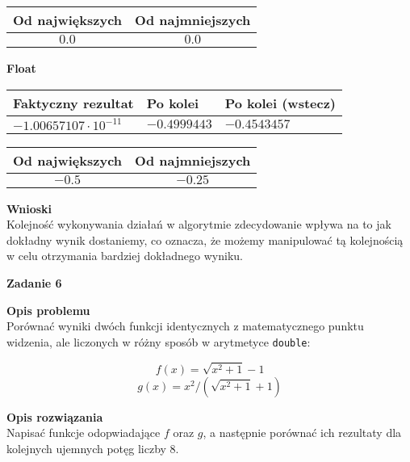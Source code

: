 \documentclass{article}
\begin{document}
\begin{center}
	\begin{tabular}{|c|c|}
		\hline
		\textbf{Od największych} & \textbf{Od najmniejszych} \\
		\hline
		$0.0$                    & $0.0$                     \\
		\hline
	\end{tabular}
\end{center}

\noindent \textbf{Float}

\begin{center}
	\begin{tabular}{|l|l|l|}
		\hline
		\textbf{Faktyczny rezultat} & \textbf{Po kolei} & \textbf{Po kolei (wstecz)} \\
		\hline
		$-1.00657107\cdot10^{-11}$  & $-0.4999443$      & $-0.4543457$               \\
		\hline
	\end{tabular}
\end{center}

\begin{center}
	\begin{tabular}{|c|c|}
		\hline
		\textbf{Od największych} & \textbf{Od najmniejszych} \\
		\hline
		$-0.5$                   & $-0.25$                   \\
		\hline
	\end{tabular}
\end{center}

\pagebreak

\noindent \textbf{Wnioski} \\
Kolejność wykonywania działań w algorytmie zdecydowanie wpływa na to jak dokładny wynik dostaniemy,
co oznacza, że możemy manipulować tą kolejnością w celu otrzymania bardziej dokładnego wyniku.

\noindent \textbf{\large Zadanie 6}

\noindent \textbf{Opis problemu} \\
Porównać wyniki dwóch funkcji identycznych z matematycznego punktu widzenia, ale liczonych
w różny sposób w arytmetyce \texttt{double}:

\[ f(x) = \sqrt{x^2 + 1} - 1 \]
\[ g(x) = x^2 / ( \sqrt{x^2 + 1} + 1 ) \]

\noindent \textbf{Opis rozwiązania} \\
Napisać funkcje odopwiadające $f$ oraz $g$, a następnie porównać ich rezultaty dla kolejnych
ujemnych potęg liczby $8$.
\end{document}
